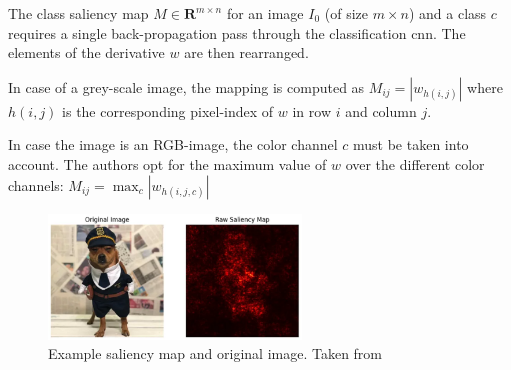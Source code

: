 The class saliency map $M\in \mathbf{R}^{m\times n}$ for an image $I_{0}$ (of size $m\times n$) and a class $c$ requires a single back-propagation pass through the classification \acrshort{cnn}. The elements of the derivative $w$ are then rearranged. 

In case of a grey-scale image, the mapping is computed as $M_{ij} = \left| w_{h(i,j)} \right|$ where $h(i,j)$ is the corresponding pixel-index of $w$ in row $i$ and column $j$. 

In case the image is an RGB-image, the color channel $c$ must be taken into account. The authors \citep{simonyan2013deep} opt for the maximum value of $w$ over the different color channels: $M_{ij} = \max_{c} \left| w_{h(i,j,c)}\right|$

\begin{figure}
    \centering
    \includegraphics[width=0.6\textwidth]{Grad Assignment/Images/saliency_example.png}
    \caption{Example saliency map and original image. Taken from \citep{newginsam2024}}
    \label{fig:saliency_example}
\end{figure}




